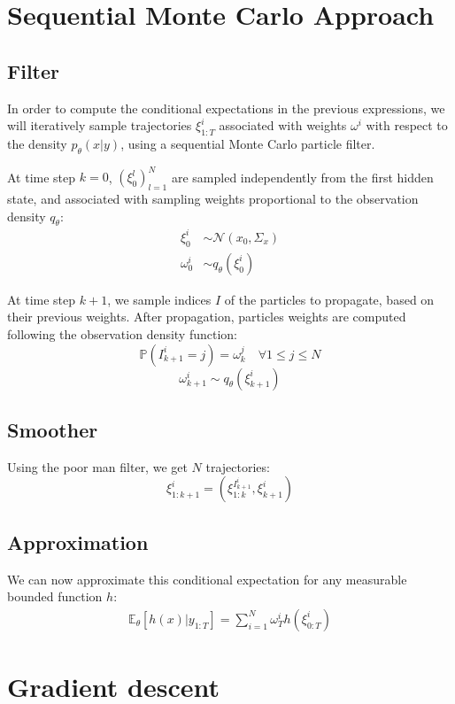 \documentclass[10pt,a4paper]{article}
\begin{document}
\section{Sequential Monte Carlo Approach}
\label{sec:smc}

\subsection{Filter}
In order to compute the conditional expectations in the previous expressions, we will iteratively sample trajectories $\xi_{1:T}^i$ associated with weights $\omega^i$ with respect to the density $p_\theta(x | y)$, using a sequential Monte Carlo particle filter.

At time step $k=0$, $(\xi_0^l)_{l=1}^N$ are sampled independently from the first hidden state, and associated with sampling weights proportional to the observation density $q_\theta$:
\begin{align*}
        \xi_0^i    & \sim \mathcal{N}(x_0, \Sigma_x) \\
        \omega_0^i & \sim q_\theta(\xi_0^i)
\end{align*}

At time step $k+1$, we sample indices $I$ of the particles to propagate, based on their previous weights.
After propagation, particles weights are computed following the observation density function:
$$\mathbb{P}(I_{k+1}^i=j) = \omega_k^j \quad \forall 1 \leq j \leq N$$
$$\omega_{k+1}^i \sim q_\theta(\xi_{k+1}^i)$$

\subsection{Smoother}
Using the poor man filter, we get $N$ trajectories:
$$\xi_{1:k+1}^{i} = (\xi_{1:k}^{I_{k+1}^i}, \xi_{k+1}^i)$$

\subsection{Approximation}
We can now approximate this conditional expectation for any measurable bounded function $h$:
\begin{align*}
        \mathbb{E}_\theta \left[ h(x) | y_{1:T} \right] = \sum_{i=1}^N \omega_T^i h(\xi_{0:T}^i)
\end{align*}

\section{Gradient descent}
\label{sec:gradient_descent}
\end{document}

